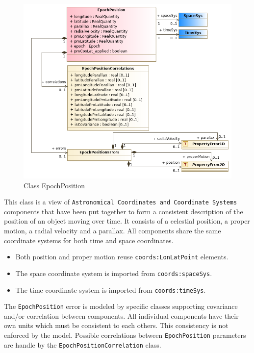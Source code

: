       \begin{figure}[h]
        \includegraphics[width=1.0\textwidth]{../model/EpochPosition.png}
        \caption{Class EpochPosition}
        \label{fig:EpochPosition}
      \end{figure}

    
  \label{sect:EpochPosition}
    This class is a view of \texttt{Astronomical Coordinates and Coordinate Systems} components that have been put together to form a consistent description of the position of an object moving over time. It consists of a celestial position, a proper motion, a radial velocity and a parallax. All components share the same coordinate systems for both time and space coordinates. \begin{itemize} \item Both position and proper motion reuse \texttt{coords:LonLatPoint} elements. \item The space coordinate system is imported from \texttt{coords:spaceSys}. \item The time coordinate system is imported from \texttt{coords:timeSys}. \end{itemize} The \texttt{EpochPosition} error is modeled by specific classes supporting covariance and/or correlation between components. All individual components have their own units which must be consistent to each others. This consistency is not enforced by the model. Possible correlations between \texttt{EpochPosition} parameters are handle by the \texttt{EpochPositionCorrelation} class.

